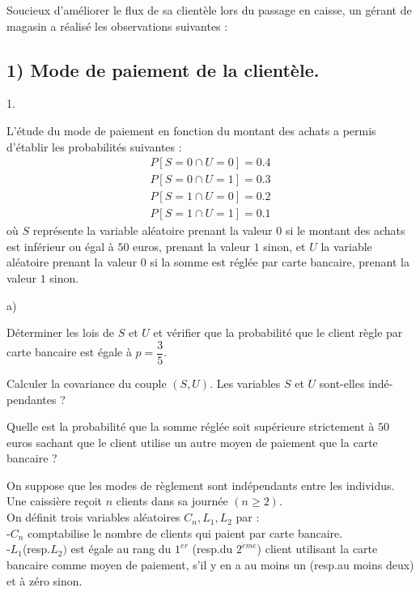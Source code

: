 \documentclass[11pt]{article}%
\begin{document}
Soucieux d'améliorer le flux de sa clientèle lors du passage en
caisse, un gérant de magasin a réalisé les observations
suivantes :

\subsection*{1) Mode de paiement de la clientèle.}

\begin{noliste}{1.}
 \setlength{\itemsep}{4mm}
\item L'étude du mode de paiement en fonction du montant des achats a
permis d'établir les probabilités suivantes : 
\[
\left. 
\begin{array}{c}
P\left[ S = 0\cap U = 0\right] = 0.4 \\
P\left[ S = 0\cap U = 1\right] = 0.3 \\
P\left[ S = 1\cap U = 0\right] = 0.2 \\
P\left[ S = 1\cap U = 1\right] = 0.1
\end{array}
\right.
\]
où $S$ représente la variable aléatoire prenant la valeur $0$ si
le montant des achats est inférieur ou égal à $50$ euros,
prenant la valeur $1$ sinon, et $U$ la variable aléatoire prenant la
valeur $0$ si la somme est réglée par carte bancaire, prenant la
valeur $1$ sinon.

\begin{noliste}{a)}
 \setlength{\itemsep}{2mm}
\item Déterminer les lois de $S$ et $U$ et vérifier que la probabilité
que le client règle par carte bancaire est égale à $p = \dfrac 35$.

\item Calculer la covariance du couple $(S,U)$. Les variables $S$ et
$U$
sont-elles indé-pendantes ?

\item Quelle est la probabilité que la somme réglée soit supérieure
strictement à $50$ euros sachant que le client utilise un autre
moyen de paiement que la carte bancaire ?
\end{noliste}

\item On suppose que les modes de règlement sont indépendants entre
les individus.\\
Une caissière reçoit $n$ clients dans sa journée $(n\geq 2)$.\\
On définit trois variables aléatoires $C_{n},L_{1},L_{2}$ par :\\
-$C_{n}$ comptabilise le nombre de clients qui paient par carte
bancaire.\\
-$L_{1}$(resp.$L_{2})$ est égale au rang du $1^{er}$ (resp.du
$2^{\grave{e}me}$) client utilisant la carte bancaire comme moyen de
paiement, s'il y
en a au moins un (resp.au moins deux) et à zéro sinon.


\end{noliste}
\end{document}
